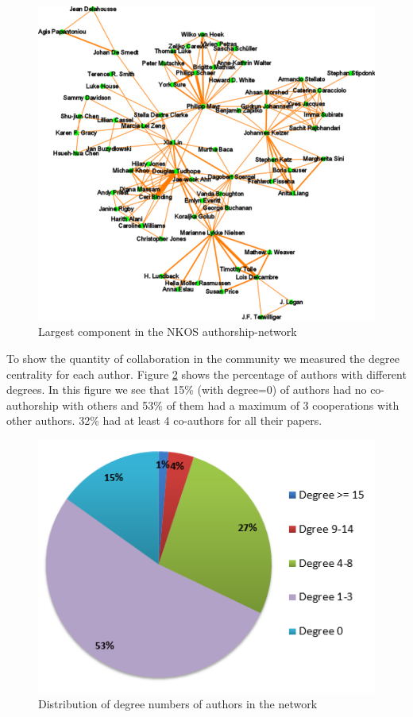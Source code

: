 \documentclass[runningheads,a4paper]{llncs}
\begin{document}
\begin{figure}[H]
	\centering
	\includegraphics[width=0.9\linewidth]{largestComponent}
	\caption{Largest component in the NKOS authorship-network}
	\label{fig:largestComponent}
\end{figure}

To show the quantity of collaboration in the community we measured the degree centrality for each author. Figure \ref{fig:degreePercentage} shows the percentage of authors with different degrees. In this figure we see that 15\% (with degree=0) of authors had no co-authorship with others and 53\% of them had a maximum of 3 cooperations with other authors. 32\% had at least 4 co-authors for all their papers.


\begin{figure}[H]
	\centering
	\includegraphics[width=0.6\linewidth]{degreePercentage}
	\caption{Distribution of degree numbers of authors in the network} 
	\label{fig:degreePercentage}
\end{figure}
\end{document}
